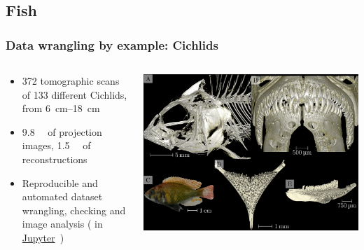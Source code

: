 \subsection{Fish}
\begin{frame}
	\frametitle{Data wrangling by example: Cichlids}
	\begin{columns}
		\begin{column}{0.49\linewidth}
			\begin{itemize}
				\item 372 tomographic scans of 133 different Cichlids, from \SIrange{6}{18}{\centi\meter}
				\item \SI{9.8}{\tera\byte} of projection images, \SI{1.5}{\tera\byte} of reconstructions
				\item Reproducible and automated dataset wrangling, checking and image analysis (\href{https://www.python.org/}{\faPython} in \href{https://jupyter.org/}{Jupyter}~\cite{Kluyver2016})
			\end{itemize}
		\end{column}
		\begin{column}{0.49\linewidth}
			\includegraphics[width=\imagewidth]{./images/cichlids/104016}%
		\end{column}
	\end{columns}
\end{frame}

